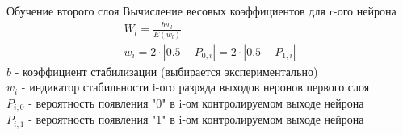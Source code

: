 \begin{frame}{Обучение второго слоя}
    Вычисление весовых коэффициентов для r-ого нейрона
    \begin{gather*}
        W_l = \frac{bw_l}{E(w_l)} \\
        w_i =   2 \cdot |0.5 - P_{0,i}| = 2 \cdot |0.5 - P_{1,i}|
    \end{gather*}
    $b$ - коэффициент стабилизации (выбирается экспериментально) \\
    $w_i$ - индикатор стабильности i-ого разряда выходов неронов первого слоя \\
    $P_{i,0}$ - вероятность появления "0" в i-ом контролируемом выходе нейрона \\
    $P_{i,1}$ - вероятность появления "1" в i-ом контролируемом выходе нейрона \\
\end{frame}